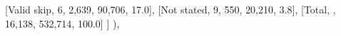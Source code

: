 \documentclass[
  11pt,
  a4paper,
]{article}
\newenvironment{Shaded}{\begin{snugshade}}{\end{snugshade}}
\newcommand{\NormalTok}[1]{\textcolor[rgb]{0.00,0.23,0.31}{#1}}
\newcommand{\StringTok}[1]{\textcolor[rgb]{0.13,0.47,0.30}{#1}}
\begin{document}
\begin{Shaded}
\begin{Highlighting}[]
\NormalTok{            [}\StringTok{\textquotesingle{}Valid skip\textquotesingle{}}\NormalTok{, }\StringTok{\textquotesingle{}6\textquotesingle{}}\NormalTok{, }\StringTok{\textquotesingle{}2,639\textquotesingle{}}\NormalTok{, }\StringTok{\textquotesingle{}90,706\textquotesingle{}}\NormalTok{, }\StringTok{\textquotesingle{}17.0\textquotesingle{}}\NormalTok{],}
\NormalTok{            [}\StringTok{\textquotesingle{}Not stated\textquotesingle{}}\NormalTok{, }\StringTok{\textquotesingle{}9\textquotesingle{}}\NormalTok{, }\StringTok{\textquotesingle{}550\textquotesingle{}}\NormalTok{, }\StringTok{\textquotesingle{}20,210\textquotesingle{}}\NormalTok{, }\StringTok{\textquotesingle{}3.8\textquotesingle{}}\NormalTok{],}
\NormalTok{            [}\StringTok{\textquotesingle{}Total\textquotesingle{}}\NormalTok{, }\StringTok{\textquotesingle{}\textquotesingle{}}\NormalTok{, }\StringTok{\textquotesingle{}16,138\textquotesingle{}}\NormalTok{, }\StringTok{\textquotesingle{}532,714\textquotesingle{}}\NormalTok{, }\StringTok{\textquotesingle{}100.0\textquotesingle{}}\NormalTok{]}
\NormalTok{        ]}
\NormalTok{    ),}


\end{Highlighting}
\end{Shaded}
\end{document}
